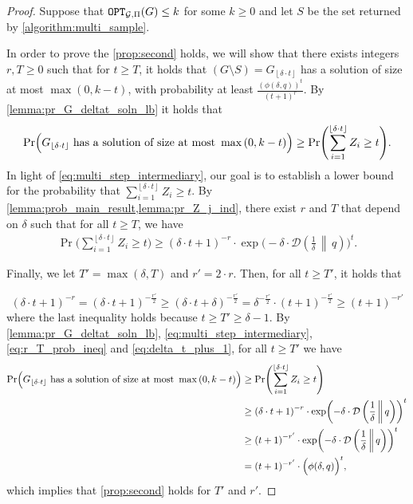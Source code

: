 \documentclass[letterpaper,11pt]{article}
\newcommand{\floor}[1]{ {\left\lfloor #1 \right\rfloor}}
\newcommand{\1}[1]{\mathds{1}\left[#1\right]}
\newcommand{\D}[2]{\mathcal{D}\left(#1\, \middle\|\,#2 \right)}
\newcommand{\OPT}{\textnormal{\texttt{OPT}}}
\newcommand{\cG}{\mathcal{G}}
\begin{document}
\begin{proof}
	
Suppose that $\OPT_{\cG,\Pi}(G) \leq k$ for some $k \geq 0$ and let $S$
be the set returned by \cref{algorithm:multi_sample}.

In order to prove the \cref{prop:second} holds, we will show that there exists integers $r,T \geq 0$
such that for $t \geq T$, it holds that $(G \setminus S) = G_{\left\lfloor \delta \cdot t \right\rfloor}$ has a solution of size at
most $\max\left( 0, k -t \right)$, with probability at least
$\frac{(\phi(\delta,q))^{t}}{(t+1)^{r}}$. 
By \cref{lemma:pr_G_deltat_soln_lb} it holds that
\begin{equation}\label{eq:multi_step_intermediary}
	\Pr\Bigl( G_{\floor{\delta \cdot t}} \text{ has a solution of size at most } \max\left( 0, k - t \right)  \Bigr) \geq \Pr\Biggl(\sum_{i =1}^{\floor{\delta \cdot t}} Z_i \geq t\Biggr).	
\end{equation}
	In light of \eqref{eq:multi_step_intermediary}, our goal is to establish a lower bound for the probability that $\sum_{i =1}^{\floor{\delta \cdot t}} Z_i \geq t$.
	By \cref{lemma:prob_main_result,lemma:pr_Z_j_ind},
 there exist $r$ and $T$ that depend on $\delta$ such that for
	all $t \geq T$, we have 
		\begin{align}\label{eq:r_T_prob_ineq}
			 \Pr\Biggl(\sum_{i =1}^{\floor{\delta \cdot t}} Z_i \geq t\Biggr) \geq \left( \delta\cdot t + 1 \right)
		^{-r} \cdot \exp\biggl( -\delta \cdot
		\D{\frac{1}{\delta}}{q}\biggr)^{t}.
		\end{align}

		Finally, we let $T' = \max\left( \delta, T \right)$ and $r' = 2 \cdot r$.
		Then, for all $t \geq T'$, it holds that

		\begin{equation}\label{eq:delta_t_plus_1}
			\left( \delta\cdot t + 1 \right)^{-r} = \left( \delta\cdot t + 1 \right)^{-\frac{r'}{2}} \geq
			\left( \delta\cdot t + \delta \right)^{-\frac{r'}{2}} = \delta^{-\frac{r'}{2}} \cdot \left( t + 1 \right)^{-\frac{r'}{2}} \geq \left( t + 1 \right)^{-r'}
		\end{equation}
		where the last inequality holds because $t \geq T' \geq \delta - 1$. By \cref{lemma:pr_G_deltat_soln_lb},
		\eqref{eq:multi_step_intermediary}, \eqref{eq:r_T_prob_ineq} and \eqref{eq:delta_t_plus_1},
		for all $t \geq T'$ we have
		\begin{align*}
			\Pr\Bigl( G_{\floor{\delta \cdot t}} \text{ has a solution of size at most } \max\left( 0, k - t \right)  \Bigr) &\geq \Pr\Biggl(\sum_{i =1}^{\floor{\delta \cdot t}} Z_i \geq t\Biggr)\\
			&\geq \left( \delta\cdot t + 1 \right)^{-r} \cdot \exp\biggl( -\delta \cdot \D{\frac{1}{\delta}}{q}\biggr)^{t}\\
			&\geq \left( t + 1 \right)^{-r'} \cdot \exp\biggl( -\delta \cdot \D{\frac{1}{\delta}}{q}\biggr)^{t}\\			
			&= (t + 1)^{-r'} \cdot \Bigl( \phi(\delta, q)\Bigr)^{t},
		\end{align*}
		which implies that \cref{prop:second} holds for $T'$ and $r'$.
\end{proof}
\end{document}
